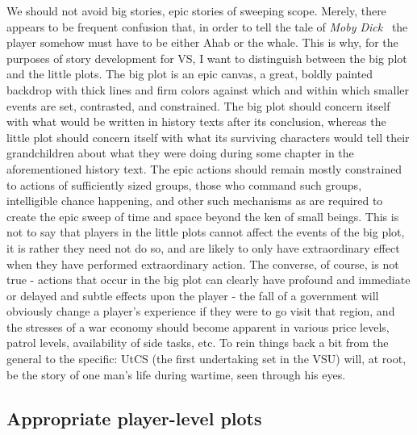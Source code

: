 We should not avoid big stories, epic stories of sweeping scope. Merely,
there appears to be frequent confusion that, in order to tell the tale
of \emph{Moby Dick}~\cite{MobyDick} the player somehow must have to be either
Ahab or the whale. This is why, for the purposes of story development
for VS, I want to distinguish between the big plot and the little
plots. The big plot is an epic canvas, a great, boldly painted
backdrop with thick lines and firm colors against which and within
which smaller events are set, contrasted, and constrained. The big
plot should concern itself with what would be written in history texts
after its conclusion, whereas the little plot should concern itself
with what its surviving characters would tell their grandchildren
about what they were doing during some chapter in the aforementioned
history text. The epic actions should remain mostly constrained to
actions of sufficiently sized groups, those who command such groups,
intelligible chance happening, and other such mechanisms as are
required to create the epic sweep of time and space beyond the ken of
small beings. This is not to say that players in the little plots
cannot affect the events of the big plot, it is rather they need not
do so, and are likely to only have extraordinary effect when they have
performed extraordinary action. The converse, of course, is not true -
actions that occur in the big plot can clearly have profound and
immediate or delayed and subtle effects upon the player - the fall of
a government will obviously change a player's experience if they were
to go visit that region, and the stresses of a war economy should
become apparent in various price levels, patrol levels, availability of
side tasks, etc. To rein things back a bit from the general to the
specific: UtCS (the first undertaking set in the VSU) will, at root, be the story of one man's life during
wartime, seen through his eyes.

\subsection{Appropriate player-level plots}

